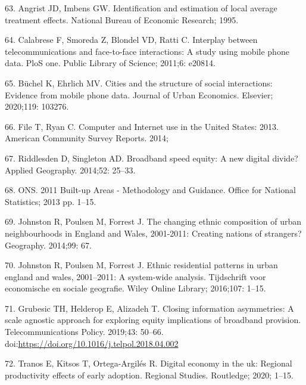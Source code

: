 \documentclass[10pt,letterpaper]{article}
\begin{document}
\leavevmode\hypertarget{ref-angrist1995identification}{}%
63. Angrist JD, Imbens GW. Identification and estimation of local
average treatment effects. National Bureau of Economic Research; 1995.

\leavevmode\hypertarget{ref-calabrese2011interplay}{}%
64. Calabrese F, Smoreda Z, Blondel VD, Ratti C. Interplay between
telecommunications and face-to-face interactions: A study using mobile
phone data. PloS one. Public Library of Science; 2011;6: e20814.

\leavevmode\hypertarget{ref-buchel2020cities}{}%
65. Büchel K, Ehrlich MV. Cities and the structure of social
interactions: Evidence from mobile phone data. Journal of Urban
Economics. Elsevier; 2020;119: 103276.

\leavevmode\hypertarget{ref-file_computer_2014}{}%
66. File T, Ryan C. Computer and Internet use in the United States:
2013. American Community Survey Reports. 2014;

\leavevmode\hypertarget{ref-riddlesden_broadband_2014}{}%
67. Riddlesden D, Singleton AD. Broadband speed equity: A new digital
divide? Applied Geography. 2014;52: 25--33.

\leavevmode\hypertarget{ref-ons2013}{}%
68. ONS. 2011 Built-up Areas - Methodology and Guidance. Office for
National Statistics; 2013 pp. 1--15.

\leavevmode\hypertarget{ref-johnston_changing_2014}{}%
69. Johnston R, Poulsen M, Forrest J. The changing ethnic composition of
urban neighbourhoods in England and Wales, 2001-2011: Creating nations
of strangers? Geography. 2014;99: 67.

\leavevmode\hypertarget{ref-johnston2016ethnic}{}%
70. Johnston R, Poulsen M, Forrest J. Ethnic residential patterns in
urban england and wales, 2001--2011: A system-wide analysis. Tijdschrift
voor economische en sociale geografie. Wiley Online Library; 2016;107:
1--15.

\leavevmode\hypertarget{ref-GRUBESIC201950}{}%
71. Grubesic TH, Helderop E, Alizadeh T. Closing information
asymmetries: A scale agnostic approach for exploring equity implications
of broadband provision. Telecommunications Policy. 2019;43: 50--66.
doi:\href{https://doi.org/https://doi.org/10.1016/j.telpol.2018.04.002}{https://doi.org/10.1016/j.telpol.2018.04.002}

\leavevmode\hypertarget{ref-tranos2020digital}{}%
72. Tranos E, Kitsos T, Ortega-Argilés R. Digital economy in the uk:
Regional productivity effects of early adoption. Regional Studies.
Routledge; 2020; 1--15.
\end{document}
